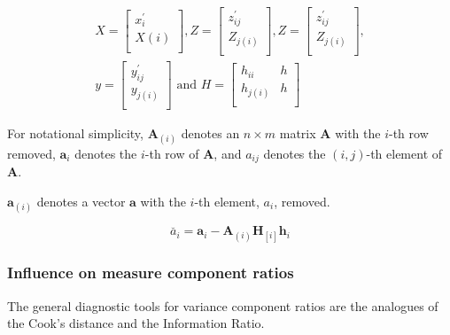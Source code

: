 \documentclass[12pt, a4paper]{report}
\theoremstyle{plain}
\theoremstyle{definition}
\theoremstyle{remark}
\begin{document}
	
	\begin{eqnarray*}
		X= \left[%
		\begin{array}{c}
			x^\prime_{i} \\
			X(i) \\
		\end{array}%
		\right],
		Z= \left[%
		\begin{array}{c}
			z^\prime_{ij} \\
			Z_{j(i)} \\
		\end{array}%
		\right] ,
		Z = \left[%
		\begin{array}{c}
			z^\prime_{ij} \\
			Z_{j(i)} \\
		\end{array}%
		\right], \\
		y = \left[%
		\begin{array}{c}
			y^\prime_{ij} \\
			y_{j(i)} \\
		\end{array}%
		\right]
		\mbox{ and } H = \left[%
		\begin{array}{cc}
			h_{ii}& h\\
			h_{j(i)} & h\\
		\end{array}%
		\right]
	\end{eqnarray*}
	
	For notational simplicity, $\boldsymbol{A}_{(i)}$ denotes an $n
	\times m$ matrix  $\boldsymbol{A}$ with the $i$-th row removed,
	$\boldsymbol{a}_{i}$ denotes the $i$-th row of $\boldsymbol{A}$,
	and $a_{ij}$ denotes the $(i, j)$-th element of $\boldsymbol{A}$.
	
	$\boldsymbol{a}_{(i)}$ denotes a vector $\boldsymbol{a}$ with the $i$-th element, $a_{i}$, removed.
	
	\begin{equation}
	\breve{a_{i}} =  \boldsymbol{a}_{i} -
	\boldsymbol{A}_{(i)}\boldsymbol{H}_{[i]}\boldsymbol{h}_{i}
	\end{equation}

	\subsubsection{Influence on measure component ratios}               %
	The general diagnostic tools for variance component ratios are the analogues of the Cook's distance and the Information Ratio.
	
\end{document}
